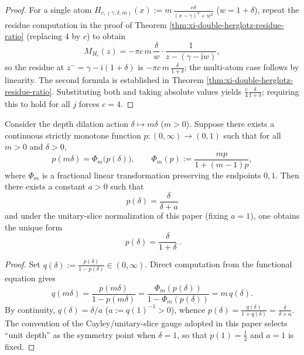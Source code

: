 \begin{proof}
For a single atom \(H_{c,(\gamma,\delta,m)}(x):=m\,\frac{c\delta}{(x-\gamma)^2+w^2}\) (\(w=1+\delta\)), repeat the residue computation in the proof of Theorem \ref{thm:xi-double-herglotz-residue-ratio} (replacing \(4\) by \(c\)) to obtain
\[
M_{H_c}(z)
=-\pi c\,m\,\frac{\delta}{w}\cdot\frac{1}{z-(\gamma-\mathrm{i}w)},
\]
so the residue at \(z^-=\gamma-\mathrm{i}(1+\delta)\) is \(-\pi c\,m\,\frac{\delta}{1+\delta}\); the multi-atom case follows by linearity.
The second formula is established in Theorem \ref{thm:xi-double-herglotz-residue-ratio}.
Substituting both and taking absolute values yields \(\frac{c}{4}\frac{\delta}{1+\delta}\); requiring this to hold for all \(j\) forces \(c=4\). \qedhere
\end{proof}

\begin{proposition}[Uniqueness of the depth weight: M\"obius linearization of the multiplicative dilation semigroup forces \texorpdfstring{$p(\delta)=\delta/(1+\delta)$}{p(delta)=delta/(1+delta)}]\label{prop:xi-depth-weight-uniqueness-mobius-linearization}
Consider the depth dilation action \(\delta\mapsto m\delta\) (\(m>0\)).
Suppose there exists a continuous strictly monotone function \(p:(0,\infty)\to(0,1)\) such that for all \(m>0\) and \(\delta>0\),
\[
p(m\delta)=\Phi_m\!\bigl(p(\delta)\bigr),
\qquad
\Phi_m(p):=\frac{m p}{1+(m-1)p},
\]
where \(\Phi_m\) is a fractional linear transformation preserving the endpoints \(0,1\).
Then there exists a constant \(a>0\) such that
\[
\boxed{\;
p(\delta)=\frac{\delta}{\delta+a}\;}
\]
and under the unitary-slice normalization of this paper (fixing \(a=1\)), one obtains the unique form
\[
\boxed{\;
p(\delta)=\frac{\delta}{1+\delta}\; }.
\]
\end{proposition}

\begin{proof}
Set \(q(\delta):=\frac{p(\delta)}{1-p(\delta)}\in(0,\infty)\).
Direct computation from the functional equation gives
\[
q(m\delta)=\frac{p(m\delta)}{1-p(m\delta)}=\frac{\Phi_m(p(\delta))}{1-\Phi_m(p(\delta))}=m\,q(\delta).
\]
By continuity, \(q(\delta)=\delta/a\) (\(a:=q(1)^{-1}>0\)), whence
\(
p(\delta)=\frac{q(\delta)}{1+q(\delta)}=\frac{\delta}{\delta+a}
\).
The convention of the Cayley/unitary-slice gauge adopted in this paper selects ``unit depth'' as the symmetry point when \(\delta=1\), so that \(p(1)=\tfrac12\) and \(a=1\) is fixed. \qedhere
\end{proof}

